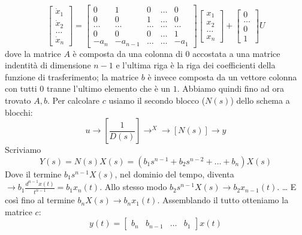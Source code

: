 \[
    \left[\begin{matrix}
        \dot{x}_1\\
        \dot{x}_2\\
        \dots\\
        \dot{x}_n
    \end{matrix}\right] = \left[\begin{matrix}
        0 & 1 & 0 & \dots & 0 \\
        0 & 0 & 1 & \dots & 0 \\
        \dots & \dots &\dots&\dots&\dots\\
        0 & 0 & 0 & \dots & 1\\
        -a_n & -a_{n-1} & \dots & \dots & -a_1
    \end{matrix}\right] \left[\begin{matrix}
        x_1\\x_2\\\dots\\x_n
    \end{matrix}\right] + \left[\begin{matrix}
        0\\\dots\\0\\1
    \end{matrix}\right] U
\]
dove la matrice $A$ è composta da una colonna di $0$ accostata a una matrice indentità di dimensione $n-1$ e l'ultima riga è la riga dei coefficienti della funzione di trasferimento; la matrice $b$ è invece composta da un vettore colonna con tutti $0$ tranne l'ultimo elemento che è un $1$.\newline
\newline
Abbiamo quindi fino ad ora trovato $A,b$. Per calcolare $c$ usiamo il secondo blocco ($N(s)$) dello schema a blocchi:
\[
    u \rightarrow \left[\frac{1}{D(s)}\right] \rightarrow^X \rightarrow  \left[N(s)\right] \rightarrow  y
\]
Scriviamo
\[
    Y(s) = N(s) X(s) = (b_1 s^{n-1} + b_2 s^{n-2} + \dots + b_n) X(s)
\]
Dove il termine $b_1 s^{n-1} X(s)$, nel dominio del tempo, diventa $\rightarrow  b_1 \frac{d^{n-1}x(t)}{t^{n-1}} = b_1 x_n(t)$.\newline
Allo stesso modo $b_2 s^{n-1}X(s) \rightarrow b_2 x_{n-1}(t)$.\newline
\dots \newline
E così fino al termine $b_n X(s) \rightarrow  b_n x_1(t)$.\newline
Assemblando il tutto otteniamo la matrice $c$:
\[
    y(t) = \left[\begin{matrix}
        b_n & b_{n-1} & \dots & b_1
    \end{matrix}\right] x(t)
\]
